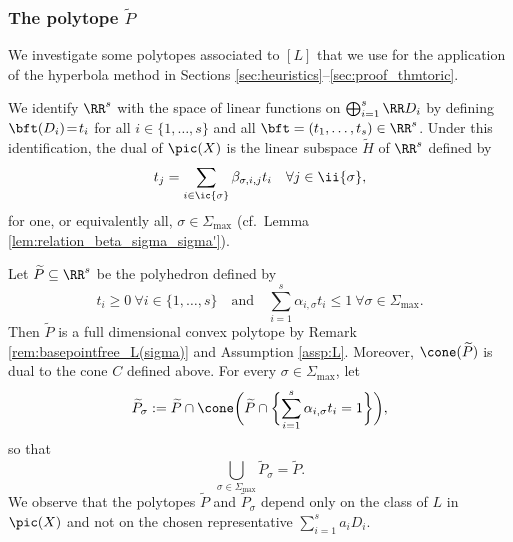 \subsubsection{The polytope $\widetilde P$}
We investigate some polytopes associated to $[L]$ that we use for
the application of the hyperbola method
in Sections \ref{sec:heuristics}--\ref{sec:proof_thmtoric}.

We identify $\RR^{s}$ with the space of linear functions on
$\bigoplus_{i=1}^s\RR D_i$ by defining
\hbox{$\bft (D_i)\!=\!t_i$} for all $i\in\{1,\dots,s\}$ and all $\bft=(t_1,\dots,t_s)\in\RR^s$.
Under this identification, the dual of $\pic(X)$ is
the linear subspace $\widetilde H$ of $\RR^{ s }$ defined by
\begin{equation}
\label{eq:dual_picard}
t_{j}
=\sum_{i\in\ic{\sigma}} \beta_{\sigma, i,j}t_i
\quad \forall j\in \ii{\sigma},
\end{equation}
for one, or equivalently all, $\sigma\in\Sigma_{\max}$
(cf.~Lemma \ref{lem:relation_beta_sigma_sigma'}).

Let $\widetilde P \subseteq \RR^{s}$ be the polyhedron
defined by
\begin{equation}
\label{eq:widetildeP}
t_i\geq0 \ \forall i\in\{1,\dots,s\} \quad \text{and} \quad
\sum_{i=1}^s\alpha_{i,\sigma} t_i\leq 1 \
\forall \sigma\in \Sigma_{\max}.
\end{equation}
Then $\widetilde P$ is a full dimensional convex polytope by
Remark \ref{rem:basepointfree_L(sigma)} and Assumption \ref{assp:L}.
Moreover, $\cone(\widetilde P)$ is dual to the cone
$C$ defined above.
For every $\sigma\in\Sigma_{\max}$, let \[
\widetilde P_\sigma:=\widetilde P \cap
\cone \biggl (
\widetilde P\cap \biggl \{
\sum_{i=1}^s\alpha_{i,\sigma} t_i =1
\biggr \} \biggr),
\]
so that
\begin{equation}
\label{eq:widetildeP_union}
\bigcup_{\sigma \in \Sigma_{\max}}\widetilde P_\sigma=\widetilde P.
\end{equation}
We observe that the polytopes $\widetilde P$ and $\widetilde P_\sigma$ depend only
on the class of $L$ in $\pic(X)$ and not on the chosen representative $\sum_{i=1}^s a_i D_i$.

